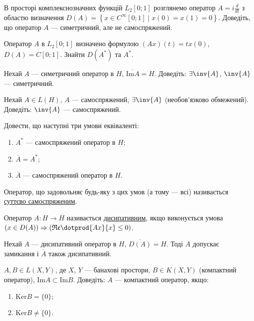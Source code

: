\begin{exercise}
    В просторі комплекснозначних функцій $L_2[0;1]$ розглянемо оператор $A = i \frac{d}{dt}$
    з областю визначення
    $D(A) = \left\{
        x \in C^\infty[0;1] \mid x(0) = x(1) = 0
    \right\}.$
    Доведіть, що оператор $A$ --- симетричний, але не самоспряжений.
\end{exercise}

\begin{exercise}
    Оператор $A$ в $L_2[0;1]$ визначено формулою $(Ax)(t) = t x(0)$, $D(A) = C[0;1]$.
    Знайти $D(A^*)$ та $A^*$.
\end{exercise}

\begin{exercise}
    Нехай $A$ --- симетричний оператор в $H$, $\overline{\mathrm{Im}A} = H$.
    Доведіть: $\exists \inv{A}$, $\inv{A}$ --- симетричний.
\end{exercise}

\begin{exercise}
    Нехай $A \in L(H)$, $A$ --- самоспряжений, $\exists \inv{A}$ (необов'язково обмежений).
    Доведіть: $\inv{A}$ --- самоспряжений.
\end{exercise}

\begin{exercise}
    Довести, що наступні три умови еквіваленті:
    \begin{enumerate}
        \item $A^*$ --- самоспряжений оператор в $H$;
        \item $\overline{A} = A^*$;
        \item $\overline{A}$ --- самоспряжений оператор в $H$.
    \end{enumerate}
    Оператор, що задовольняє будь-яку з цих умов (а тому --- всі) називається
    \ul{суттєво самоспряженим}.
\end{exercise}

\begin{theory}
    Оператор $A: H \to H$ називається \ul{дисипативним}, якщо виконується умова
    $(x \in D(A)) \Rightarrow (\mathfrak{Re}\dotprod{Ax}{x} \leq 0)$.
\end{theory}

\begin{exercise}
    Нехай $A$ --- дисипативний оператор в $H$, $\overline{D(A)} = H$.
    Тоді $A$ допускає замикання і $\overline{A}$ також дисипативний.
\end{exercise}

\begin{exercise}
    $A,B \in L(X,Y)$, де $X$, $Y$ --- банахові простори, $B \in K(X,Y)$ (компактний оператор),
    $\mathrm{Im} A \subset \mathrm{Im} B$. Доведіть: $A$ --- компактний оператор, якщо:
    \begin{enumerate}
        \item $\mathrm{Ker} B = \{0\}$;
        \item $\mathrm{Ker} B \neq \{0\} $.
    \end{enumerate}    
\end{exercise}